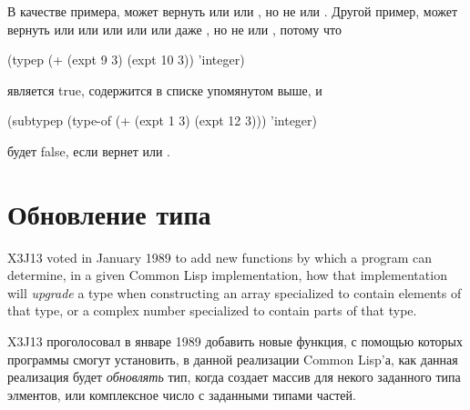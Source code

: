 \begin{defun}[Function]
\begin{new}
В качестве примера,  может вернуть
 или  или , но не
 или .
Другой пример,  может вернуть  или 
или  или  или  или даже , но не  или , потому что
\begin{lisp}
(typep (+ (expt 9 3) (expt 10 3)) 'integer)
\end{lisp}
является true,  содержится в списке упомянутом выше, и 
\begin{lisp}
(subtypep (type-of (+ (expt 1 3) (expt 12 3))) 'integer)
\end{lisp}
будет false, если  вернет  или .

\end{new}
\end{defun}

\section{Обновление типа}

X3J13 voted in January 1989
to add new functions by which a program
can determine, in a given Common Lisp implementation, how that
implementation will \emph{upgrade} a type when constructing an array
specialized to contain elements of that type,
or a complex number specialized to contain parts of that type.

X3J13 проголосовал в январе 1989
добавить новые функция, с помощью которых программы смогут установить, в данной
реализации Common Lisp'а, как данная реализация будет \emph{обновлять} тип,
когда создает массив для некого заданного типа элментов, или комплексное число с
заданными типами частей.

